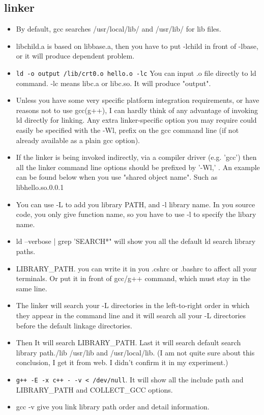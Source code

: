 \documentclass[a4paper,12pt,twoside]{book}
\begin{document}
\subsection{linker}
			 \begin{itemize}
			 \item By default, gcc searches /usr/local/lib/ and /usr/lib/ for lib files.
			 
			 \item libchild.a is based on libbase.a, then you have to put -lchild in front of -lbase, or it will produce dependent problem. 
			 
			\item \verb=ld -o output /lib/crt0.o hello.o -lc= You can input .o file directly to ld command. -lc means libc.a or libc.so. It will produce "output". 
					 
			\item Unless you have some very specific platform integration requirements, or have reasons not to use gcc(g++), I can hardly think of any advantage of invoking ld directly for linking. Any extra linker-specific option you may require could easily be specified with the -Wl, prefix on the gcc command line (if not already available as a plain gcc option).

			 \item If the linker is being invoked indirectly, via a compiler driver (e.g. 'gcc') then all the linker command line options should be prefixed by '-Wl,' . An example can be found below when you use "shared object name". Such as libhello.so.0.0.1

    \item You can use -L to add you library PATH, and -l library name. In you source code, you only give function name, so you have to use -l to specify the libary name. 

	\item ld --verbose | grep 'SEARCH*" will show you all the default ld search library paths.
			
   \item LIBRARY\_PATH. you can write it in you .cshrc or .bashrc to affect all your terminals. Or put it in front of gcc/g++ command, which must stay in the same line.        
	 
	\item The linker will search your -L directories in the left-to-right order in which they appear in the command line and it will search all your -L directories before the default linkage directories.
	
	\item Then It will search LIBRARY\_PATH. Last it will search default search library path./lib /usr/lib and /usr/local/lib. (I am not quite sure about this conclusion, I get it from web. I didn't confirm it in my experiment.)
	
	\item \verb=g++ -E -x c++ - -v < /dev/null=. It will show all the include path and LIBRARY\_PATH and COLLECT\_GCC options.

	\item gcc -v give you link library path order and detail information. 
	\end{itemize}
\end{document}
